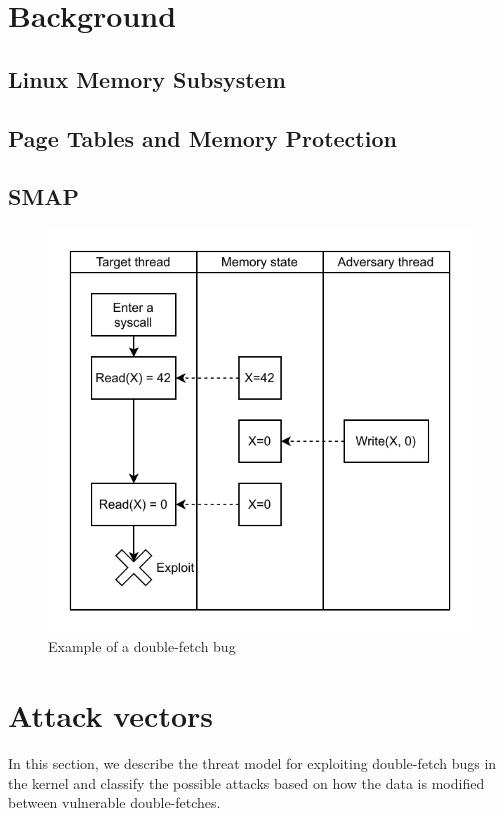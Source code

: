 \documentclass[letterpaper,twocolumn,10pt, anonymous]{article}
\begin{document}
\section{Background}

\subsection{Linux Memory Subsystem}

\subsection{Page Tables and Memory Protection}

\subsection{SMAP}

\begin{figure}[]
  \centering
  \includegraphics[width=.85\linewidth]{img/doublefetch.pdf}
  \caption{Example of a double-fetch bug}
  \label{fig:doublefetch}
\end{figure}


\section{Attack vectors}
\label{sec:threats}

In this section, we describe the threat model for exploiting double-fetch
bugs in the kernel and classify the possible attacks based on how the 
data is modified between vulnerable double-fetches.
\end{document}
